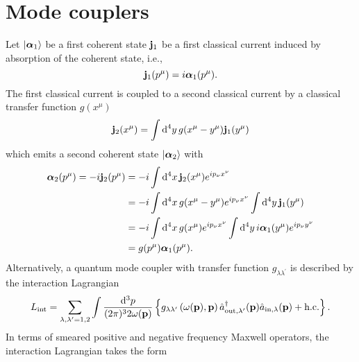 \section{Mode couplers}

Let $\ket{\boldsymbol{\alpha}_1}$ be a first coherent state $\vb{j}_1$ be a first classical current induced by absorption of the coherent state, i.e.,
\begin{equation*}
	\vb{j}_1(p^\mu)
	=
	i\boldsymbol{\alpha}_1(p^\mu)
	.
\end{equation*}
The first classical current is coupled to a second classical current by a classical transfer function $g(x^\mu)$
\begin{equation*}
	\vb{j}_2(x^\mu)
	=
	\int\dd[4]{y}
	g(x^\mu-y^\mu)
	\vb{j}_1(y^\mu)
\end{equation*}
which emits a second coherent state $\ket{\boldsymbol{\alpha}_2}$ with
\begin{equation*}
	\begin{split}
		\boldsymbol{\alpha}_2(p^\mu)
		=
		-i\vb{j}_2(p^\mu)
		&=
		-i
		\int\dd[4]{x}
		\vb{j}_2(x^\mu)
		e^{ip_\nu x^\nu}
		\\
		&=
		-i
		\int\dd[4]{x}
		g(x^\mu-y^\mu)
		e^{ip_\nu x^\nu}
		\int\dd[4]{y}
		\vb{j}_1(y^\mu)
		\\
		&=
		-i
		\int\dd[4]{x}
		g(x^\mu)
		e^{ip_\nu x^\nu}
		\int\dd[4]{y}
		i\boldsymbol{\alpha}_1(y^\mu)
		e^{ip_\nu y^\nu}
		\\
		&=
		g(p^\mu)
		\boldsymbol{\alpha}_1(p^\mu)
		.
	\end{split}
\end{equation*}
Alternatively, a quantum mode coupler with transfer function $g_{\lambda\lambda^\prime}$ is described by the interaction Lagrangian
\begin{equation}
	L_\text{int}
	=
	\sum_{\lambda,\lambda^\prime=1,2}
	\int\frac{\dd[3]{p}}{(2\pi)^32\omega(\vb{p})}
	\left\{
		g_{\lambda\lambda^\prime}\left(\omega(\vb{p}),\vb{p}\right)
		\hat{a}_{\text{out},\lambda^\prime}^\dagger(\vb{p})
		\hat{a}_{\text{in},\lambda}(\vb{p})
		+
		\text{h.c.}
	\right\}
	.
\end{equation}
In terms of smeared positive and negative frequency Maxwell operators, the interaction Lagrangian takes the form~\cite[p.~130]{Haroche2006}
